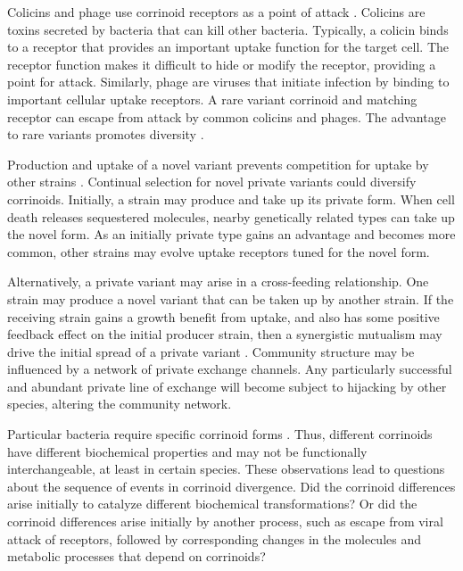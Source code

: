 \documentclass[\mydocfontsize]{article}
\begin{document}
\begin{multicols}{2}
 Colicins and phage use corrinoid receptors as a point of attack \autocite{bradbeer76transport,di-masi73transport,kadner77relation}. Colicins are toxins secreted by bacteria that can kill other bacteria. Typically, a colicin binds to a receptor that provides an important uptake function for the target cell. The receptor function makes it difficult to hide or modify the receptor, providing a point for attack. Similarly, phage are viruses that initiate infection by binding to important cellular uptake receptors. A rare variant corrinoid and matching receptor can escape from attack by common colicins and phages. The advantage to rare variants promotes diversity \autocite{smith05evidence}.

 Production and uptake of a novel variant prevents competition for uptake by other strains \autocite{degnan14human,niehus17the-evolution}. Continual selection for novel private variants could diversify corrinoids. Initially, a strain may produce and take up its private form. When cell death releases sequestered molecules, nearby genetically related types can take up the novel form. As an initially private type gains an advantage and becomes more common, other strains may evolve uptake receptors tuned for the novel form. 

Alternatively, a private variant may arise in a cross-feeding relationship. One strain may produce a novel variant that can be taken up by another strain. If the receiving strain gains a growth benefit from uptake, and also has some positive feedback effect on the initial producer strain, then a synergistic mutualism may drive the initial spread of a private variant \autocite{frank94genetics,frank95the-origin}. Community structure may be influenced by a network of private exchange channels. Any particularly successful and abundant private line of exchange will become subject to hijacking by other species, altering the community network.

 Particular bacteria require specific corrinoid forms \autocite{yi12versatility,mok13growth,keller14exogenous}. Thus, different corrinoids have different biochemical properties and may not be functionally interchangeable, at least in certain species. These observations lead to questions about the sequence of events in corrinoid divergence. Did the corrinoid differences arise initially to catalyze different biochemical transformations? Or did the corrinoid differences arise initially by another process, such as escape from viral attack of receptors, followed by corresponding changes in the molecules and metabolic processes that depend on corrinoids?


\end{multicols}
\end{document}
